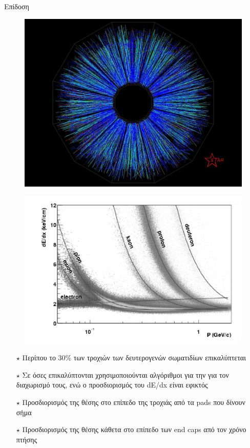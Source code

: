 \documentclass[18pt,notheorems,hyperref={pdfauthor=whatever}]{beamer}
\begin{document}
\begin{frame}{Επίδοση}
     \begin{minipage}{0.47\textwidth}
        \begin{figure}
            \centering
            \includegraphics[scale=0.15]{images/TPC_recon.png}
        \end{figure}
        \begin{figure}
            \centering
            \includegraphics[scale=0.35]{images/TPC_ident.png}
        \end{figure}
    \end{minipage}
    \begin{minipage}{0.5\textwidth}
        \begin{itemize}
            \item[$\star$] Περίπου το 30\% των τροχιών των δευτερογενών σωματιδίων επικαλύπτεται
            \item[$\star$] Σε όσες επικαλύπτονται χρησιμοποιούνται αλγόριθμοι για την για τον διαχωρισμό τους, ενώ ο προσδιορισμός του dE/dx είναι εφικτός
            \item[$\star$] Προσδιορισμός της θέσης στο επίπεδο της τροχιάς από τα pads που δίνουν σήμα
            \item[$\star$] Προσδιορισμός της θέσης κάθετα στο επίπεδο των end caps από τον χρόνο πτήσης
         \end{itemize}
    \end{minipage}
\end{frame}
\end{document}
